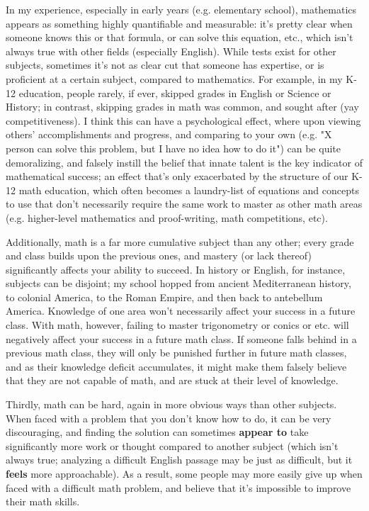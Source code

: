 \documentclass{homework}
\begin{document}
In my experience, especially in early years (e.g. elementary school), mathematics appears as
something highly quantifiable and measurable: it's pretty clear when someone knows this or that
formula, or can solve this equation, etc., which isn't always true with other fields (especially
English). While tests exist for other subjects, sometimes it's not as clear cut that someone has
expertise, or is proficient at a certain subject, compared to mathematics. For example, in my K-12
education, people rarely, if ever, skipped grades in English or Science or History; in contrast,
skipping grades in math was common, and sought after (yay competitiveness). I think this can have a
psychological effect, where upon viewing others' accomplishments and progress, and comparing to your
own (e.g. "X person can solve this problem, but I have no idea how to do it") can be quite
demoralizing, and falsely instill the belief that innate talent is the key indicator of mathematical
success; an effect that's only exacerbated by the structure of our K-12 math education, which often
becomes a laundry-list of equations and concepts to use that don't necessarily require the same work
to master as other math areas (e.g. higher-level mathematics and proof-writing, math competitions,
etc).

Additionally, math is a far more cumulative subject than any other; every grade and class builds
upon the previous ones, and mastery (or lack thereof) significantly affects your ability to succeed.
In history or English, for instance, subjects can be disjoint; my school hopped from ancient
Mediterranean history, to colonial America, to the Roman Empire, and then back to antebellum
America. Knowledge of one area won't necessarily affect your success in a future class. With math,
however, failing to master trigonometry or conics or etc. will negatively affect your success in a
future math class. If someone falls behind in a previous math class, they will only be punished
further in future math classes, and as their knowledge deficit accumulates, it might make them
falsely believe that they are not capable of math, and are stuck at their level of knowledge.

Thirdly, math can be hard, again in more obvious ways than other subjects. When faced with a
problem that you don't know how to do, it can be very discouraging, and finding the solution can
sometimes \textbf{appear to} take significantly more work or thought compared to another subject
(which isn't always true; analyzing a difficult English passage may be just as difficult, but it
\textbf{feels} more approachable). As a result, some people may more easily give up when faced with
a difficult math problem, and believe that it's impossible to improve their math skills.
\end{document}
